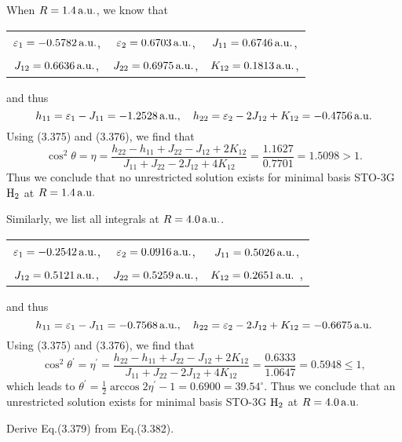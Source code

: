 \documentclass[a4paper]{book}
\newcounter{exercise}[chapter]
\newcounter{solution}[chapter]
\newcommand{\au}{{\rm a.u.}}
\begin{document}
	\begin{solution}
	
	When $R = 1.4 \, \au$, we know that
	\begin{center}
	\begin{tabular}{ccc}
		$\varepsilon_1 = -0.5782\,\au$, & $\varepsilon_2 = 0.6703\, \au$, & $J_{11} = 0.6746\,\au$, \\
		$J_{12} = 0.6636\,\au$, & $J_{22} = 0.6975\,\au$, & $K_{12} = 0.1813\,\au$,
	\end{tabular}
	\end{center}
	and thus
	\[
		h_{11} = \varepsilon_1 - J_{11} = -1.2528 \, \au , \quad h_{22} = \varepsilon_2 - 2J_{12} + K_{12} = -0.4756 \, \au 
	\]
	Using (3.375) and (3.376), we find that
	\[
		\cos^2 \theta = \eta = \frac{ h_{22} - h_{11} + J_{22} -J_{12} + 2 K_{12} }{ J_{11} + J_{22} - 2 J_{12} + 4 K_{12} } = \frac{ 1.1627 }{ 0.7701 } = 1.5098 > 1 .
	\]
	Thus we conclude that no unrestricted solution exists for minimal basis STO-3G $\ce{H2}$ at $R = 1.4 \, \au$
	
	Similarly, we list all integrals at $R = 4.0\, \au$.
	\begin{center}
	\begin{tabular}{ccc}
		$\varepsilon_1 = -0.2542\,\au$, & $\varepsilon_2 = 0.0916\, \au$, & $J_{11} = 0.5026\,\au$, \\
		$J_{12} = 0.5121\,\au$, & $J_{22} = 0.5259\,\au$, & $K_{12} = 0.2651\,\au$ ,
	\end{tabular}
	\end{center}
	and thus
	\[
		h_{11} = \varepsilon_1 - J_{11} = -0.7568 \, \au , \quad h_{22} = \varepsilon_2 - 2J_{12} + K_{12} = -0.6675 \, \au 
	\]
	Using (3.375) and (3.376), we find that
	\[
		\cos^2 \theta^\prime = \eta^\prime = \frac{ h_{22} - h_{11} + J_{22} -J_{12} + 2 K_{12} }{ J_{11} + J_{22} - 2 J_{12} + 4 K_{12} } = \frac{ 0.6333 }{ 1.0647 } = 0.5948 \le 1 ,
	\]
	which leads to $\theta^\prime = \frac{1}{2} \arccos{ 2 \eta^\prime - 1 } = 0.6900 = 39.54^\circ$. Thus we conclude that an unrestricted solution exists for minimal basis STO-3G $\ce{H2}$ at $R = 4.0 \, \au$
	
	\end{solution}
	
	\begin{exercise}
	Derive Eq.(3.379) from Eq.(3.382).
	\end{exercise}
	
\end{document}
